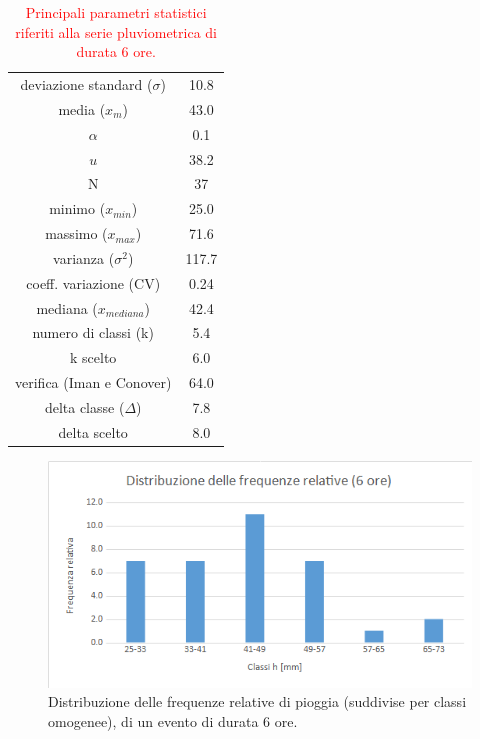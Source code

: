 \begin{table}[H] \centering
        \caption{\textcolor{red}{Principali parametri statistici riferiti alla serie pluviometrica di durata 6 ore.}}
     \begin{tabular}{cc}
        \toprule
    deviazione standard ($\sigma$) &  10.8\\
    media ($x_m$)              &  43.0\\
    $\alpha$            &  0.1 \\
    $u$           & 38.2\\
    N                &  37\\
    minimo ($x_{min}$)             & 25.0 \\
    massimo ($x_{max}$)            &  71.6\\
    varianza ($\sigma^2$)            &  117.7\\
    coeff. variazione (CV)    & 0.24 \\
    mediana ($x_{mediana}$)        &42.4  \\
    numero di classi (k)      &  5.4 \\
    k scelto                 &  6.0 \\
    verifica (Iman e Conover) &  64.0\\
    delta classe ($\Delta$)          & 7.8  \\
    delta scelto             & 8.0 \\
            \bottomrule
            \end{tabular}
    \end{table}

\begin{figure}[H]\centering
        \includegraphics[scale=.6]{immagini/freq_piogg_rel_6ore.png}
        \caption{Distribuzione delle frequenze relative di pioggia (suddivise per classi omogenee), di un evento di durata 6 ore.}
      \label{freq_rel_piogg_05ore}
\end{figure}
    
